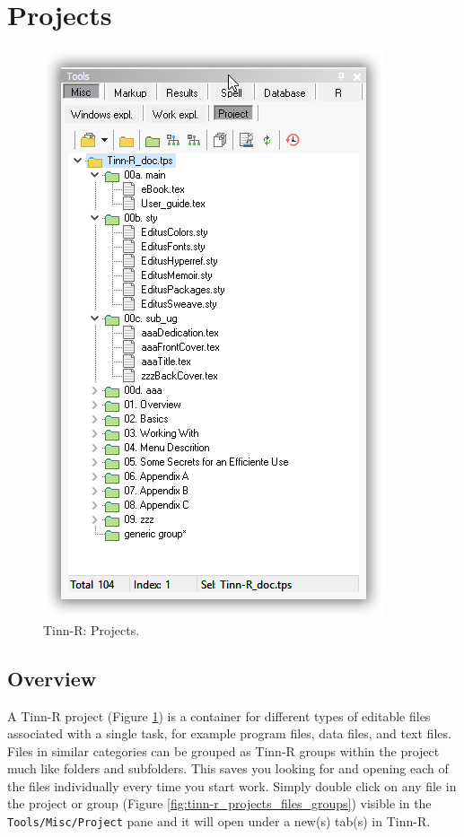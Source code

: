 
\hypertarget{working_projects}{}
\section{Projects}

\begin{figure}[H]
  \begin{center}
    \includegraphics[scale=0.60]{./res/tools_misc_project.png}
  \end{center}
  \caption{Tinn-R: Projects.}
  \label{fig:tinn-r_projects}
\end{figure}

\subsection{Overview}
A Tinn-R project (Figure \ref{fig:tinn-r_projects}) is a container for different types of editable 
files associated with a single task, for example program files, data files, and text files. 
Files in similar categories can be grouped as Tinn-R groups within the project much like folders and subfolders.  
This saves you looking for and opening each of the files individually every time you start work. 
Simply double click on any file in the project or group
(Figure \ref{fig:tinn-r_projects_files_groups})
visible in the \texttt{Tools/Misc/Project} pane
and it will open under a new(s) tab(s) in Tinn-R.

